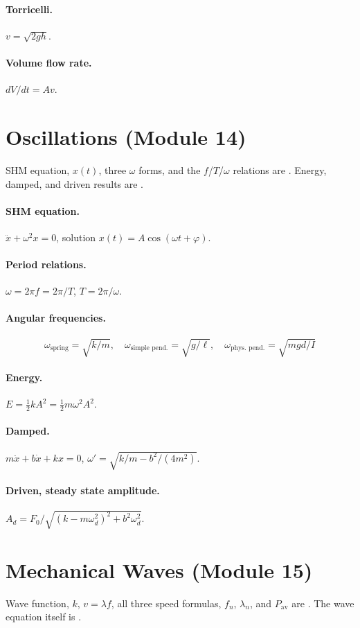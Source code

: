 \documentclass[11pt]{article}
\begin{document}
\paragraph{Torricelli.} $v = \sqrt{2 g h}$.
\paragraph{Volume flow rate.} $dV/dt = A v$.

\section{Oscillations (Module 14)}
SHM equation, $x(t)$, three $\omega$ forms, and the $f$/$T$/$\omega$ relations
are . Energy, damped, and driven results are
.

\paragraph{SHM equation.} $\ddot{x} + \omega^{2}x = 0$, solution $x(t) = A\cos(\omega t + \varphi)$.
\paragraph{Period relations.} $\omega = 2\pi f = 2\pi/T$, $T = 2\pi/\omega$.
\paragraph{Angular frequencies.}
\[
\omega_{\text{spring}} = \sqrt{k/m},\quad
\omega_{\text{simple pend.}} = \sqrt{g/\ell},\quad
\omega_{\text{phys. pend.}} = \sqrt{mgd/I}
\]
\paragraph{Energy.} $E = \tfrac{1}{2} k A^{2} = \tfrac{1}{2} m\omega^{2} A^{2}$.
\paragraph{Damped.} $m\ddot x + b\dot x + kx = 0$, $\omega' = \sqrt{k/m - b^{2}/(4m^{2})}$.
\paragraph{Driven, steady state amplitude.}
$A_d = F_0/\sqrt{(k - m\omega_d^{2})^{2} + b^{2}\omega_d^{2}}$.

\section{Mechanical Waves (Module 15)}
Wave function, $k$, $v=\lambda f$, all three speed formulas, $f_n$, $\lambda_n$,
and $P_{\text{av}}$ are . The wave equation itself is
.
\end{document}
